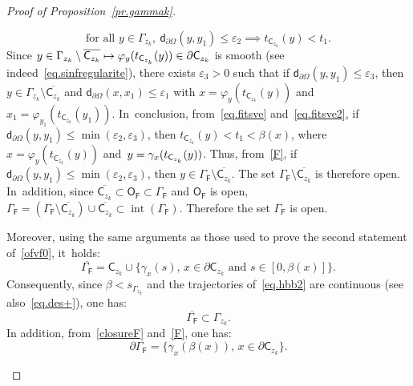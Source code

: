 \documentclass[10pt]{amsart}
\newcommand\mto{\mathchoice{\longmapsto}{\mapsto}{\mapsto}{\mapsto}}
\DeclareMathOperator{\inte}{int}
\let\pa\partial
\let\ve\varepsilon
\theoremstyle{plain}
\theoremstyle{definition}
\begin{document}
\begin{proof}[Proof of Proposition~\ref{pr.gammak}]
\begin{enumerate}
\begin{equation}
\text{for all } y\in \Gamma_{z_k},\ \mathsf d_{\partial \Omega}\left(y,y_1\right)\leq \ve_2 \implies t_{\mathsf C_{z_k}}(y)<t_1.
\end{equation}
Since $y\in \Gamma_{z_k}\setminus \overline{\mathsf C_{z_k}}\mto \varphi_{y}(t_{\mathsf C_{z_k}}(y))\in \pa \mathsf C_{z_k}$ is smooth (see indeed~\eqref{eq.sinfregularite}), there exists $\ve_3>0$ such that if $\mathsf d_{\partial \Omega}\left(y,y_1\right)\le \ve_3$, then $y\in \Gamma_{z_k}\setminus \overline{\mathsf C_{z_k}} $ and $\mathsf d_{\partial \Omega}(x,x_1)\le \ve_1$ with $x=\varphi_{y}(t_{\mathsf C_{z_k}}(y))$ and $x_1=\varphi_{y_1}(t_{\mathsf C_{z_k}}(y_1))$. In~conclusion, from~\eqref{eq.fitsve} and~\eqref{eq.fitsve2}, if $\mathsf d_{\partial \Omega}\left(y,y_1\right)\le \min(\ve_2,\ve_3)$, then $t_{\mathsf C_{z_k}}(y)<t_1<\beta(x)$, where $x=\varphi_{y}(t_{\mathsf C_{z_k}}(y))$ and~$y=\nobreak\gamma_x(t_{\mathsf C_{z_k}}(y))$. Thus, from~\eqref{F}, if
$\mathsf d_{\partial \Omega}\left(y,y_1\right)\le \min(\ve_2,\ve_3)$, then
$y\in \Gamma_{\mathsf F}\setminus \overline{ \mathsf C_{z_k}}$. The set $\Gamma_{\mathsf F}\setminus \overline{ \mathsf C_{z_k}}$ is therefore open. In~addition, since $\overline{\mathsf C_{z_k}}\subset \mathsf O_{\mathsf F}\subset \Gamma_{\mathsf F}$ and $ \mathsf O_{\mathsf F}$ is open, $\Gamma_{\mathsf F}=(\Gamma_{\mathsf F}\setminus \overline {\mathsf C_{z_k}})\cup \overline{\mathsf C_{z_k}}\subset\inte(\Gamma_{\mathsf F})$. Therefore the set $\Gamma_{\mathsf F}$ is open.

Moreover, using the same arguments as those used to prove the second statement of~\eqref{ofvf0}, it~holds:
\begin{equation}\label{closureF}
\overline{ \Gamma_{\mathsf F}}= \mathsf C_{z_k} \cup \big \{ \gamma_x(s), \, x\in \pa \mathsf C_{z_k} \text{ and } s\in [0,\beta(x)]\big \}.
\end{equation}
Consequently, since $\beta< s_{\Gamma_{z_k}}$ and the trajectories of~\eqref{eq.hbb2} are continuous (see also~\eqref{eq.des+}), one has:
\[
\overline{ \Gamma_{\mathsf F}}\subset \Gamma_{z_k}.
\]
In addition, from~\eqref{closureF} and~\eqref{F}, one has:
\begin{equation}\label{boundaryF}
\pa \Gamma_{\mathsf F}=\big \{ \gamma_x(\beta(x)), \, x\in \pa \mathsf C_{z_k} \big \}.
\end{equation}


\end{enumerate}
\end{proof}
\end{document}
